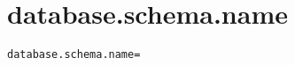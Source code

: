 \section{database.schema.name}
\label{configuration:DatabaseSchemaName}
\AvailableInJavaOnly{\TODO}
\begin{lstlisting}[style=Props,caption={Usage example for \textit{database.schema.name}}]
database.schema.name=
\end{lstlisting}